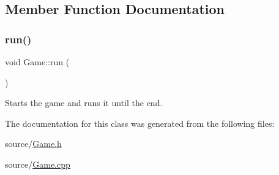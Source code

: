 \subsection{Member Function Documentation}
\mbox{\label{classGame_a1ab78f5ed0d5ea879157357cf2fb2afa}} 
\subsubsection{\texorpdfstring{run()}{run()}}
{\footnotesize\ttfamily void Game\+::run (\begin{DoxyParamCaption}{ }\end{DoxyParamCaption})}

Starts the game and runs it until the end. 

The documentation for this class was generated from the following files\+:\begin{DoxyCompactItemize}
\item 
source/\hyperlink{Game_8h}{Game.\+h}\item 
source/\hyperlink{Game_8cpp}{Game.\+cpp}\end{DoxyCompactItemize}
